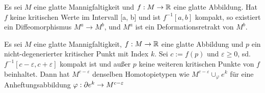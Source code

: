 \begin{theorem}
    \label{theorem:erstes deformationslemma}
    Es sei $M$ eine glatte Mannigfaltigkeit und $f: M \rightarrow { \mathbb R }$ eine
    glatte Abbildung. Hat $f$ keine kritischen Werte im Intervall [a, b] und ist
    $f^{-1}[a, b]$ kompakt, so existiert ein Diffeomorphismus 
    $M^a \rightarrow M^b$, und $M^a$ ist ein Deformationsretrakt von $M^b$.
\end{theorem}

\begin{theorem}
    \label{theorem:zweites deformationslemma}
    Es sei $M$ eine glatte Mannigfaltigkeit, $f: M \rightarrow { \mathbb R }$ eine glatte
    Abbildung und $p$ ein nicht-degenerierter kritischer Punkt mit Index 
    $k$. Sei $c := f(p)$ und $\varepsilon \geq 0$, sd. 
    $f^{-1}[c - \varepsilon, c + \varepsilon]$ kompakt ist und außer $p$ keine 
    weiteren kritischen Punkte von $f$ beinhaltet. Dann hat $M^{c-\varepsilon}$
    denselben Homotopietypen wie $M^{c - \varepsilon} \cup_{\varphi} e^k$
    für eine Anheftungsabbildung 
    $\varphi: { \partial } e^k \rightarrow M^{c-\varepsilon}$
\end{theorem}
